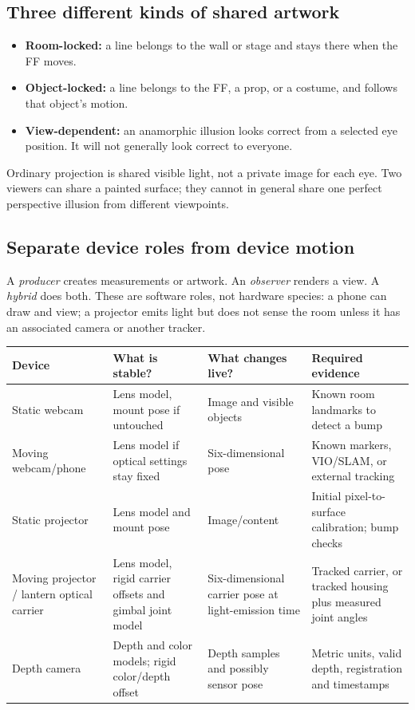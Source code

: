 \documentclass[11pt,a4paper]{article}
\begin{document}
\subsection{Three different kinds of shared artwork}
\begin{itemize}
  \item \textbf{Room-locked:} a line belongs to the wall or stage and stays there
    when the FF moves.
  \item \textbf{Object-locked:} a line belongs to the FF, a prop, or a costume,
    and follows that object's motion.
  \item \textbf{View-dependent:} an anamorphic illusion looks correct from a
    selected eye position. It will not generally look correct to everyone.
\end{itemize}
Ordinary projection is shared visible light, not a private image for each eye.
Two viewers can share a painted surface; they cannot in general share one
perfect perspective illusion from different viewpoints.

\subsection{Separate device roles from device motion}
A \emph{producer} creates measurements or artwork. An \emph{observer} renders
a view. A \emph{hybrid} does both. These are software roles, not hardware
species: a phone can draw and view; a projector emits light but does not
sense the room unless it has an associated camera or another tracker.

\begin{tabularx}{\linewidth}{@{}L{31mm}XXX@{}}
\toprule
Device & What is stable? & What changes live? & Required evidence\\
\midrule
Static webcam & Lens model, mount pose if untouched & Image and visible objects &
Known room landmarks to detect a bump\\
Moving webcam/phone & Lens model if optical settings stay fixed &
Six-dimensional pose & Known markers, VIO/SLAM, or external tracking\\
Static projector & Lens model and mount pose & Image/content &
Initial pixel-to-surface calibration; bump checks\\
Moving projector / lantern optical carrier & Lens model, rigid carrier
offsets and gimbal joint model & Six-dimensional carrier pose at
light-emission time & Tracked carrier, or tracked housing plus measured
joint angles\\
Depth camera & Depth and color models; rigid color/depth offset &
Depth samples and possibly sensor pose &
Metric units, valid depth, registration and timestamps\\
\bottomrule
\end{tabularx}
\end{document}
